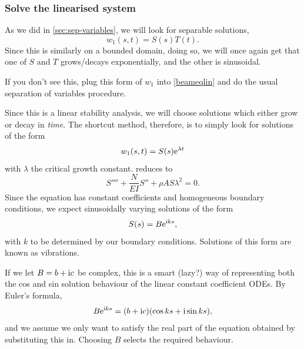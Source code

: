 \documentclass[main.tex]{subfiles}
\begin{document}
\subsubsection*{\StepThree Solve the linearised system}
As we did in \cref{sec:sep-variables}, we will look for separable solutions,
\begin{equation}
w_1(s,t) = S(s)T(t).
\end{equation}
Since this is similarly on a bounded domain, doing so, we will once again get that one of $S$ and $T$ grows/decays exponentially, and the other is sinusoidal.
\begin{do-it-yourself}
	If you don't see this, plug this form of $w_1$ into \cref{beameqlin} and do the usual separation of variables procedure.
\end{do-it-yourself}
Since this is a linear stability analysis, we will choose solutions which either grow or decay in \emph{time}. The shortcut method, therefore, is to simply look for solutions of the form
\begin{equation}
\label{form-of-w1}
w_1(s,t) = S(s)\mathrm{e}^{\lambda t}
\end{equation}
with $\lambda$ the critical growth constant.  reduces to
\begin{equation}
\label{linbeam1}
S'''' + \frac{N}{EI}S'' +\rho A S\lambda^2=0.
\end{equation}
Since the equation has constant coefficients and homogeneous boundary conditions, we expect sinusoidally varying solutions of the form 
\begin{equation}
\label{complexsol}
S(s) = B\mathrm{e}^{\mathrm{i} k s},
\end{equation}
with $k$ to be determined by our boundary conditions. Solutions of this form are known as vibrations.

If we let $B=b+\mathrm{i} c$ be complex, this is a smart (lazy?) way of representing both the cos and sin solution behaviour of the linear constant coefficient ODEs. By Euler's formula,
\begin{equation}
	B\mathrm{e}^{\mathrm{i} k s} = (b + \mathrm{i} c)(\cos ks + \mathrm{i} \sin ks),
\end{equation}
and we assume we only want to satisfy the real part of the equation obtained by substituting this in. Choosing $B$ selects the required behaviour.
\end{document}
